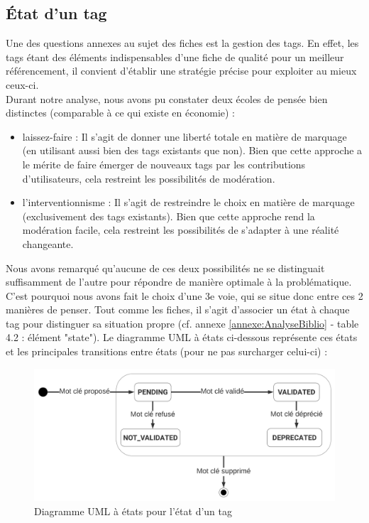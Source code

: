 \pagebreak
\subsection*{État d'un \gls{tag}}

Une des questions annexes au sujet des \glspl{fiche} est la gestion des \glspl{tag}. En effet, les \glspl{tag} étant des éléments indispensables d'une \gls{fiche} de qualité pour un meilleur référencement, il convient d'établir une stratégie précise pour exploiter au mieux ceux-ci. \\

Durant notre analyse, nous avons pu constater deux écoles de pensée bien distinctes (comparable à ce qui existe en économie) : 

\begin{itemize}
    \item laissez-faire : Il s'agit de donner une liberté totale en matière de marquage (en utilisant aussi bien des \glspl{tag} existants que non). Bien que cette approche a le mérite de faire émerger de nouveaux \glspl{tag} par les contributions d'utilisateurs, cela restreint les possibilités de modération.
    \item l'interventionnisme : Il s'agit de restreindre le choix en matière de marquage (exclusivement des \glspl{tag} existants). Bien que cette approche rend la modération facile, cela restreint les possibilités de s'adapter à une réalité changeante.
\end{itemize}

Nous avons remarqué qu'aucune de ces deux possibilités ne se distinguait suffisamment de l'autre pour répondre de manière optimale à la problématique.
C'est pourquoi nous avons fait le choix d'une 3e voie, qui se situe donc entre ces 2 manières de penser. 
Tout comme les \glspl{fiche}, il s'agit d'associer un état à chaque \gls{tag} pour distinguer sa situation propre (cf. annexe \ref{annexe:AnalyseBiblio} - table 4.2 : élément "state"). 
Le diagramme UML à états ci-dessous représente ces états et les principales transitions entre états (pour ne pas surcharger celui-ci) :

\begin{figure}[H]
    \includegraphics[width=\textwidth,height=\textheight,keepaspectratio]{images/cahierDesCharges/StateTags.png}
    \centering
    \caption{Diagramme UML à états pour l'état d'un \gls{tag}}
    \label{pic:stateDiagramForTags}
\end{figure}

